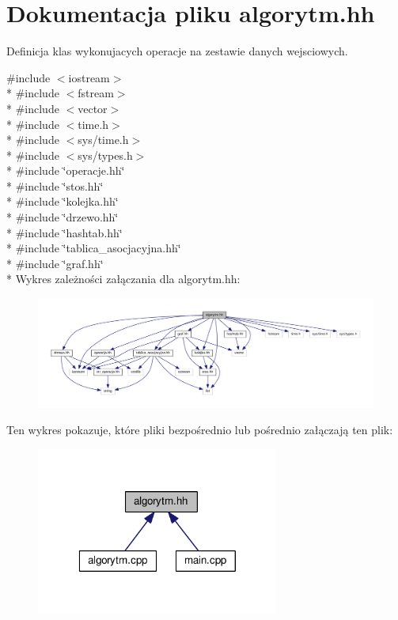\hypertarget{algorytm_8hh}{\section{Dokumentacja pliku algorytm.\-hh}
\label{algorytm_8hh}
}


Definicja klas wykonujacych operacje na zestawie danych wejsciowych.  


{\ttfamily \#include $<$iostream$>$}\\*
{\ttfamily \#include $<$fstream$>$}\\*
{\ttfamily \#include $<$vector$>$}\\*
{\ttfamily \#include $<$time.\-h$>$}\\*
{\ttfamily \#include $<$sys/time.\-h$>$}\\*
{\ttfamily \#include $<$sys/types.\-h$>$}\\*
{\ttfamily \#include \char`\"{}operacje.\-hh\char`\"{}}\\*
{\ttfamily \#include \char`\"{}stos.\-hh\char`\"{}}\\*
{\ttfamily \#include \char`\"{}kolejka.\-hh\char`\"{}}\\*
{\ttfamily \#include \char`\"{}drzewo.\-hh\char`\"{}}\\*
{\ttfamily \#include \char`\"{}hashtab.\-hh\char`\"{}}\\*
{\ttfamily \#include \char`\"{}tablica\-\_\-asocjacyjna.\-hh\char`\"{}}\\*
{\ttfamily \#include \char`\"{}graf.\-hh\char`\"{}}\\*
Wykres zależności załączania dla algorytm.\-hh\-:\nopagebreak
\begin{figure}[H]
\begin{center}
\leavevmode
\includegraphics[width=350pt]{algorytm_8hh__incl}
\end{center}
\end{figure}
Ten wykres pokazuje, które pliki bezpośrednio lub pośrednio załączają ten plik\-:\nopagebreak
\begin{figure}[H]
\begin{center}
\leavevmode
\includegraphics[width=226pt]{algorytm_8hh__dep__incl}
\end{center}
\end{figure}
